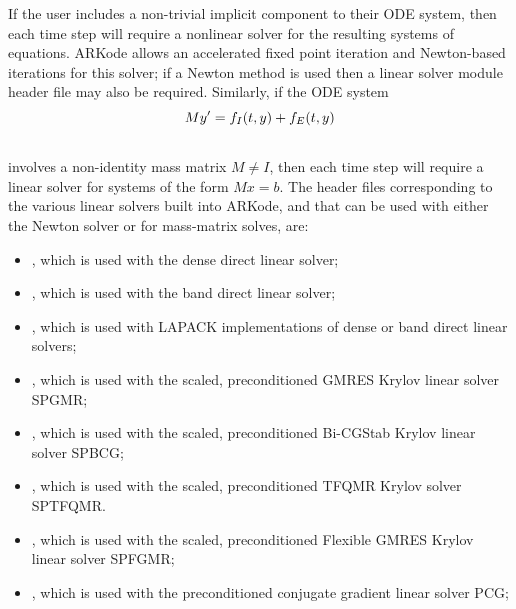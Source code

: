 \documentclass[letterpaper,10pt,english]{sphinxmanual}
\begin{document}
If the user includes a non-trivial implicit component to their
ODE system, then each time step will require a nonlinear solver for
the resulting systems of equations.  ARKode allows an accelerated
fixed point iteration and Newton-based iterations for this solver; if
a Newton method is used then a linear solver module header file may
also be required.  Similarly, if the ODE system
\begin{gather}
\begin{split}M y' = f_I(t,y) + f_E(t,y)\end{split}\notag\\\begin{split}\end{split}\notag
\end{gather}
involves a non-identity mass matrix $M\ne I$, then each time
step will require a linear solver for systems of the form
$Mx=b$.  The header files corresponding to the various linear
solvers built into ARKode, and that can be used with either the Newton
solver or for mass-matrix solves, are:
\begin{itemize}
\item {} 
, which is used with the dense direct linear solver;

\item {} 
, which is used with the band direct linear solver;

\item {} 
, which is used with LAPACK implementations of dense
or band direct linear solvers;

\item {} 
, which is used with the scaled, preconditioned GMRES
Krylov linear solver SPGMR;

\item {} 
, which is used with the scaled, preconditioned
Bi-CGStab Krylov linear solver SPBCG;

\item {} 
, which is used with the scaled, preconditioned
TFQMR Krylov solver SPTFQMR.

\item {} 
, which is used with the scaled, preconditioned
Flexible GMRES Krylov linear solver SPFGMR;

\item {} 
, which is used with the preconditioned
conjugate gradient linear solver PCG;

\end{itemize}
\end{document}
